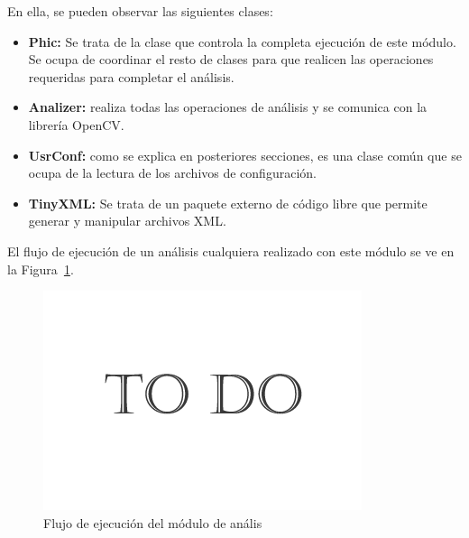 		
En ella, se pueden observar las siguientes clases:\\

\begin{itemize}

	\item \textbf{Phic:} Se trata de la clase que controla la completa ejecución de este módulo. Se ocupa de coordinar el resto de clases para que realicen las operaciones requeridas para completar el análisis.
	
	\item \textbf{Analizer:} realiza todas las operaciones de análisis y se comunica con la librería OpenCV.
	
	\item \textbf{UsrConf:} como se explica en posteriores secciones, es una clase común que se ocupa de la lectura de los archivos de configuración.
	
	\item \textbf{TinyXML:} Se trata de un paquete externo de código libre que permite generar y manipular archivos XML.
	
\end{itemize}	
			
El flujo de ejecución de un análisis cualquiera realizado con este módulo se ve en la Figura~\ref{fig:diagramaflujoPHIC}.\\

		\begin{figure}[htbp]
		\centering
		\includegraphics[scale=0.47]{graphics/todo.png}
		\caption{Flujo de ejecución del módulo de anális}
		\label{fig:diagramaflujoPHIC}
		\end{figure}
		
		
